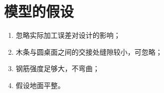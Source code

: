 \section{模型的假设}

\begin{enumerate}
\item 忽略实际加工误差对设计的影响；
\item 木条与圆桌面之间的交接处缝隙较小，可忽略；
\item 钢筋强度足够大，不弯曲；
\item 假设地面平整。
\end{enumerate}
\clearpage
